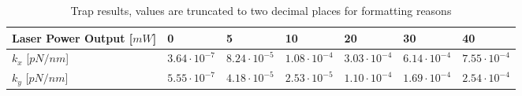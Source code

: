 \begin{table}[h!]
    \begin{tabular}{|l|l|l|l|l|l|l|}
        \hline
        Laser Power Output {[}$mW${]} & 0         & 5         & 10         & 20         & 30         & 40         \\ \hline
        $k_x$     {[}$pN/nm${]}       & $3.64\cdot 10^{-7}$ & $8.24\cdot 10^{-5}$ & $1.08\cdot 10^{-4}$ & $3.03\cdot 10^{-4}$ & $6.14\cdot 10^{-4}$ & $7.55\cdot 10^{-4}$ \\ \hline
        $k_y$     {[}$pN/nm${]}       & $5.55\cdot 10^{-7}$   & $4.18\cdot 10^{-5}$ & $2.53\cdot 10^{-5}$  & $1.10\cdot 10^{-4}$ & $1.69\cdot 10^{-4}$ & $2.54\cdot 10^{-4}$ \\ \hline
    \end{tabular}
\caption{Trap results, values are truncated to two decimal places for formatting reasons}
\label{tab:second-results}
\end{table}


